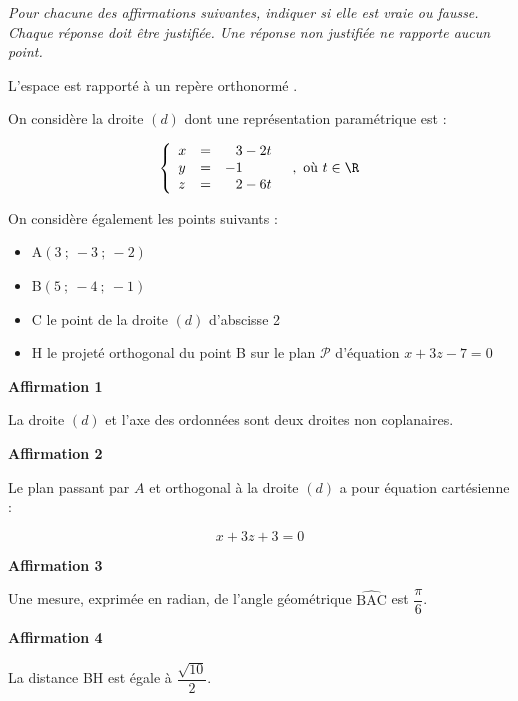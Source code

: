 \medskip

\emph{Pour chacune des affirmations suivantes, indiquer si elle est vraie ou fausse. Chaque réponse doit être justifiée. Une réponse non justifiée ne rapporte aucun point.}

\medskip

L'espace est rapporté à un repère orthonormé \Oijk.

On considère la droite $(d)$ dont une représentation paramétrique est :


\[\left\{\begin{array}{l c l}
x&=&\phantom{-}3 - 2 t \\
y&=&-1 \\
z&=&\phantom{-}2 - 6 t
\end{array} \quad, \text { où } t \in \R\right.\]

On considère également les points suivants :

\begin{itemize}
\item A$(3~;~-3~;~-2)$
\item B$(5~;~-4~;~-1)$
\item C le point de la droite $(d)$ d'abscisse 2
\item H le projeté orthogonal du point B sur le plan $\mathcal{P}$ d'équation $x + 3z -7 = 0$
\end{itemize}

\medskip

\textbf{Affirmation 1}

La droite $(d)$ et l'axe des ordonnées sont deux droites non coplanaires.

\bigskip

\textbf{Affirmation 2}

Le plan passant par $A$ et orthogonal à la droite $(d)$ a pour équation cartésienne :

\[x + 3z + 3= 0\]

\bigskip

\textbf{Affirmation 3}

Une mesure, exprimée en radian, de l'angle géométrique $\widehat{\mathrm{BAC}}$ est $\dfrac{\pi}{6}$.

\bigskip

\textbf{Affirmation 4}

La distance BH est égale à $\dfrac{\sqrt{10}}{2}$.

